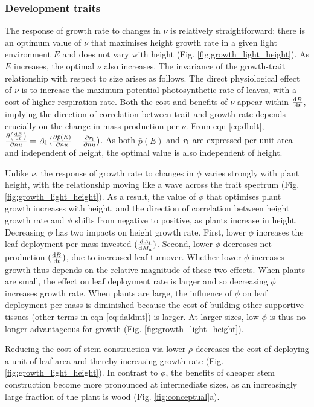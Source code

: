 \documentclass[9pt,twocolumn,twoside]{pnas-new}
\begin{document}
\subsubsection{Development traits}  The response of growth rate to changes in $\nu$ is relatively straightforward: there is an optimum value of $\nu$ that maximises height growth rate in a given light environment $E$ and does not vary with height (Fig. \ref{fig:growth_light_height}). As $E$ increases, the optimal $\nu$ also increases. The invariance of the growth-trait relationship with respect to size arises as follows. The direct physiological effect of $\nu$ is to increase the maximum potential photosynthetic rate of leaves, with a cost of higher respiration rate. Both the cost and benefits of $\nu$ appear within $\frac{ {\rm d}B} {{\rm d}t}$, implying the direction of correlation between trait and growth rate depends crucially on the change in mass production per $\nu$.
From eqn \ref{eq:dbdt}, $\frac{\partial \left( \frac{ {\rm d}B} {{\rm d}t}\right)}{\partial nu} = A_{\rm l} \, (\frac{ \partial \bar{p}(E)}{\partial nu}  - \frac{ \partial r_{\rm l}}{\partial nu} )$. As both $\bar{p}(E)$ and $r_{\rm l}$ are expressed per unit area and independent of height, the optimal value is also independent of height.

Unlike $\nu$, the response of growth rate to changes in $\phi$ varies strongly with plant height, with the relationship moving like a wave across the trait spectrum (Fig. \ref{fig:growth_light_height}). As a result, the value of $\phi$ that optimises plant growth increases with height, and the direction of correlation between height growth rate and $\phi$ shifts from negative to positive, as plants increase in height. Decreasing $\phi$ has two impacts on height growth rate. First, lower $\phi$ increases the leaf deployment per mass invested $(\frac{{\rm d}A_{\rm l}}{{\rm d}M_{\rm a}})$. Second, lower $\phi$ decreases net production $(\frac{{\rm d}B}{{\rm d}t})$, due to increased leaf turnover. Whether lower $\phi$ increases growth thus depends on the relative magnitude of these two effects. When plants are small, the effect on leaf deployment rate is larger and so decreasing $\phi$ increases growth rate. When plants are large, the influence of $\phi$ on leaf deployment per mass is diminished because the cost of building other supportive tissues (other terms in eqn \ref{eq:daldmt}) is larger. At larger sizes, low $\phi$ is thus no longer advantageous for growth (Fig. \ref{fig:growth_light_height}).

Reducing the cost of stem construction via lower $\rho$ decreases the cost of deploying a unit of leaf area and thereby increasing growth rate (Fig. \ref{fig:growth_light_height}). In contrast to $\phi$, the benefits of cheaper stem construction become more pronounced at intermediate sizes, as an increasingly large fraction of the plant is wood (Fig. \ref{fig:conceptual}a).
\end{document}
